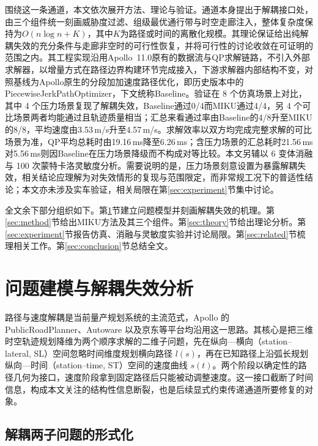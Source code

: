 \documentclass[a4paper,11pt]{ctexart}
\theoremstyle{definition}
\begin{document}
围绕这一条通道，本文依次展开方法、理论与验证。通道本身提出于解耦接口处，由三个组件统一刻画威胁度过滤、组级最优通行带与时空走廊注入，整体复杂度保持为$O(n\log n + K)$，其中$K$为路径或时间的离散化规模。其理论保证给出纯解耦失效的充分条件与走廊非空时的可行性恢复，并将可行性的讨论收敛在可证明的范围之内。其工程实现沿用Apollo~11.0原有的数据流与QP求解链路，不引入外部求解器，以增量方式在路径边界构建环节完成接入，下游求解器内部结构不变，对照基线为Apollo原生的分段加加速度路径优化，即历史版本中的PiecewiseJerkPathOptimizer，下文统称Baseline。验证在 8 个仿真场景上对比，其中 4 个压力场景复现了解耦失效，Baseline通过0/4而MIKU通过4/4，另 4 个可比场景两者均能通过且轨迹质量相当；汇总来看通过率由Baseline的4/8升至MIKU的8/8，平均速度由3.53\,m/s升至4.57\,m/s。求解效率以双方均完成完整求解的可比场景为准，QP平均总耗时由19.16\,ms降至6.26\,ms；含压力场景的汇总耗时21.56\,ms对5.56\,ms则因Baseline在压力场景降级而不构成对等比较。本文另辅以 6 变体消融与 100 次蒙特卡洛灵敏度分析。需要说明的是，压力场景刻意设置为暴露解耦失效，相关结论应理解为对失效情形的复现与范围限定，而非常规工况下的普适性结论；本文亦未涉及实车验证，相关局限在第\ref{sec:experiment}节集中讨论。

全文余下部分组织如下。第\ref{sec:problem}节建立问题模型并刻画解耦失效的机理。第\ref{sec:method}节给出MIKU方法及其三个组件。第\ref{sec:theory}节给出理论分析。第\ref{sec:experiment}节报告仿真、消融与灵敏度实验并讨论局限。第\ref{sec:related}节梳理相关工作。第\ref{sec:conclusion}节总结全文。

\section{问题建模与解耦失效分析}
\label{sec:problem}

路径与速度解耦是当前量产规划系统的主流范式，Apollo 的 PublicRoadPlanner、Autoware 以及京东等平台均沿用这一思路。其核心是把三维时空轨迹规划降维为两个顺序求解的二维子问题，先在纵向—横向（station--lateral, SL）空间忽略时间维度规划横向路径 $l(s)$，再在已知路径上沿弧长规划纵向—时间（station--time, ST）空间的速度曲线 $s(t)$。两个阶段以确定性的路径几何为接口，速度阶段拿到固定路径后只能被动调整速度。这一接口截断了时间信息，构成本文关注的结构性信息断裂，也是后续显式约束传递通道所要修复的对象。

\subsection{解耦两子问题的形式化}
\label{subsec:decouple_formalize}
\end{document}
